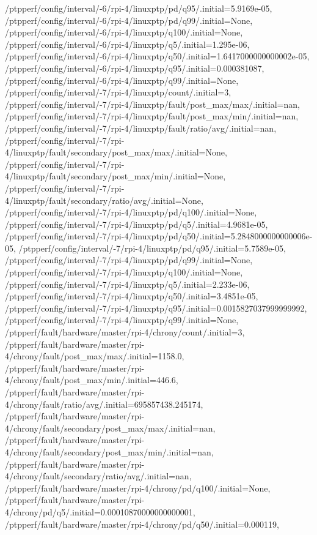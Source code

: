 {    /ptpperf/config/interval/-6/rpi-4/linuxptp/pd/q95/.initial=5.9169e-05,
    /ptpperf/config/interval/-6/rpi-4/linuxptp/pd/q99/.initial=None,
    /ptpperf/config/interval/-6/rpi-4/linuxptp/q100/.initial=None,
    /ptpperf/config/interval/-6/rpi-4/linuxptp/q5/.initial=1.295e-06,
    /ptpperf/config/interval/-6/rpi-4/linuxptp/q50/.initial=1.6417000000000002e-05,
    /ptpperf/config/interval/-6/rpi-4/linuxptp/q95/.initial=0.000381087,
    /ptpperf/config/interval/-6/rpi-4/linuxptp/q99/.initial=None,
    /ptpperf/config/interval/-7/rpi-4/linuxptp/count/.initial=3,
    /ptpperf/config/interval/-7/rpi-4/linuxptp/fault/post_max/max/.initial=nan,
    /ptpperf/config/interval/-7/rpi-4/linuxptp/fault/post_max/min/.initial=nan,
    /ptpperf/config/interval/-7/rpi-4/linuxptp/fault/ratio/avg/.initial=nan,
    /ptpperf/config/interval/-7/rpi-4/linuxptp/fault/secondary/post_max/max/.initial=None,
    /ptpperf/config/interval/-7/rpi-4/linuxptp/fault/secondary/post_max/min/.initial=None,
    /ptpperf/config/interval/-7/rpi-4/linuxptp/fault/secondary/ratio/avg/.initial=None,
    /ptpperf/config/interval/-7/rpi-4/linuxptp/pd/q100/.initial=None,
    /ptpperf/config/interval/-7/rpi-4/linuxptp/pd/q5/.initial=4.9681e-05,
    /ptpperf/config/interval/-7/rpi-4/linuxptp/pd/q50/.initial=5.2848000000000006e-05,
    /ptpperf/config/interval/-7/rpi-4/linuxptp/pd/q95/.initial=5.7589e-05,
    /ptpperf/config/interval/-7/rpi-4/linuxptp/pd/q99/.initial=None,
    /ptpperf/config/interval/-7/rpi-4/linuxptp/q100/.initial=None,
    /ptpperf/config/interval/-7/rpi-4/linuxptp/q5/.initial=2.233e-06,
    /ptpperf/config/interval/-7/rpi-4/linuxptp/q50/.initial=3.4851e-05,
    /ptpperf/config/interval/-7/rpi-4/linuxptp/q95/.initial=0.0015827037999999992,
    /ptpperf/config/interval/-7/rpi-4/linuxptp/q99/.initial=None,
    /ptpperf/fault/hardware/master/rpi-4/chrony/count/.initial=3,
    /ptpperf/fault/hardware/master/rpi-4/chrony/fault/post_max/max/.initial=1158.0,
    /ptpperf/fault/hardware/master/rpi-4/chrony/fault/post_max/min/.initial=446.6,
    /ptpperf/fault/hardware/master/rpi-4/chrony/fault/ratio/avg/.initial=695857438.245174,
    /ptpperf/fault/hardware/master/rpi-4/chrony/fault/secondary/post_max/max/.initial=nan,
    /ptpperf/fault/hardware/master/rpi-4/chrony/fault/secondary/post_max/min/.initial=nan,
    /ptpperf/fault/hardware/master/rpi-4/chrony/fault/secondary/ratio/avg/.initial=nan,
    /ptpperf/fault/hardware/master/rpi-4/chrony/pd/q100/.initial=None,
    /ptpperf/fault/hardware/master/rpi-4/chrony/pd/q5/.initial=0.00010870000000000001,
    /ptpperf/fault/hardware/master/rpi-4/chrony/pd/q50/.initial=0.000119,
}
